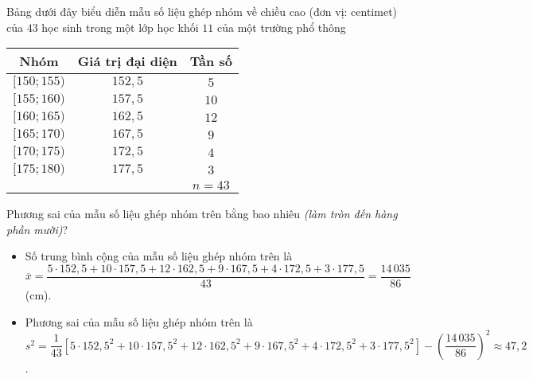 \begin{bt}%
	Bảng dưới đây biểu diễn mẫu số liệu ghép nhóm về chiều cao (đơn vị: centimet) của $43$ học sinh trong một lớp học khối $11$ của một trường phổ thông
	\begin{center}
		\begin{tabular}{|c|c|c|}
			\hline
			Nhóm        & Giá trị đại diện & Tần số \\
			\hline
			$[150;155)$ & $152{,}5$        & $5$    \\
			\hline
			$[155;160)$ & $157{,}5$        & $10$   \\
			\hline
			$[160;165)$ & $162{,}5$        & $12$   \\
			\hline
			$[165;170)$ & $167{,}5$        & $9$    \\
			\hline
			$[170;175)$ & $172{,}5$        & $4$    \\
			\hline
			$[175;180)$ & $177{,}5$        & $3$    \\
			\hline
			            &                  & $n=43$ \\
			\hline
		\end{tabular}
	\end{center}
	Phương sai của mẫu số liệu ghép nhóm trên bằng bao nhiêu \textit{(làm tròn đến hàng phần mười)}?
	\loigiai
	{
		\begin{itemize}
			\item Số trung bình cộng của mẫu số liệu ghép nhóm trên là\\
			      $\overline{x}=\dfrac{5\cdot 152{,}5+10\cdot 157{,}5+12\cdot 162{,}5+9\cdot 167{,}5+4\cdot 172{,}5+3\cdot 177{,}5}{43} =\dfrac {14\,035}{86}$ (cm).
			\item Phương sai của mẫu số liệu ghép nhóm trên là\\
			      $s^2=\dfrac{1}{43} \left[5\cdot 152{,}5^2+10\cdot 157{,}5^2+12\cdot 162{,}5^2+9\cdot 167{,}5^2+4\cdot 172{,}5^2+3\cdot 177{,}5^2\right]-\left(\dfrac {14\,035}{86}\right)^2\approx 47{,}2$.
		\end{itemize}
	}
\end{bt}

